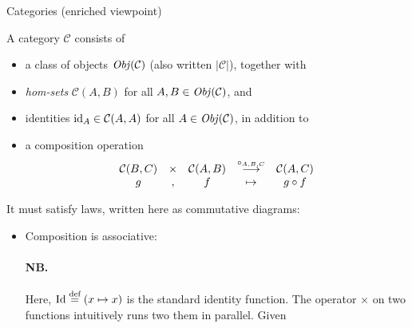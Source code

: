 \begin{definition} Categories (enriched viewpoint)

  A category $\mathcal C$ consists of
  \begin{itemize}
  \item a class of objects $\operatorname{\mathit{Obj}}(\mathcal C)$ (also written $|\mathcal C|$),
    together with
  \item \emph{hom-sets} $\mathcal C(A, B)$ for all $A, B \in \operatorname{\mathit{Obj}}(\mathcal C)$,
    and
  \item identities $\mathrm{id}_{ A } \in \mathcal C(A, A)$ for all $A \in \operatorname{\mathit{Obj}}(\mathcal C)$,
    in addition to
  \item a composition operation
    \begin{equation*}
      \begin{matrix}
        \mathcal C(B, C) & \times & \mathcal C(A, B) &
        \overset{\circ_{A,B,C}}{\longrightarrow}
        & \mathcal C(A, C) \\
        g & , & f & \mapsto & g \circ f
      \end{matrix}
    \end{equation*}
  \end{itemize}

  It must satisfy laws, written here as commutative diagrams:

  \begin{itemize}
  \item Composition is associative:

    \begin{center}
  \end{center}

  \begin{framed}
    \paragraph{NB.} Here, $\mathrm{Id} \stackrel{\text{def}}{=} (x \mapsto x)$ is the standard
    identity function.  The operator $\times$ on two functions intuitively runs
    two them in parallel.
    Given


\end{framed}
\end{itemize}
\end{definition}
